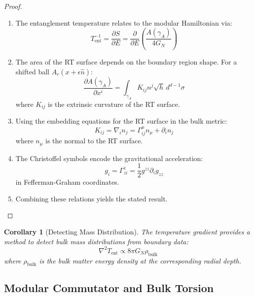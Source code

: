 \documentclass[12pt,a4paper]{article}
\newtheorem{corollary}[theorem]{Corollary}
\begin{document}
\begin{proof}
\begin{enumerate}
    \item The entanglement temperature relates to the modular Hamiltonian via:
    \begin{equation}
    T_{\text{ent}}^{-1} = \frac{\partial S}{\partial E} = \frac{\partial}{\partial E}\left( \frac{A(\gamma_A)}{4G_N} \right)
    \end{equation}
    
    \item The area of the RT surface depends on the boundary region shape. For a shifted ball $A_r(x + \epsilon \hat{n})$:
    \begin{equation}
    \frac{\partial A(\gamma_A)}{\partial x^i} = \int_{\gamma_A} K_{ij} n^j \sqrt{h} \, d^{d-1}\sigma
    \end{equation}
    where $K_{ij}$ is the extrinsic curvature of the RT surface.
    
    \item Using the embedding equations for the RT surface in the bulk metric:
    \begin{equation}
    K_{ij} = \nabla_i n_j = \Gamma^\mu_{ij} n_\mu + \partial_i n_j
    \end{equation}
    where $n_\mu$ is the normal to the RT surface.
    
    \item The Christoffel symbols encode the gravitational acceleration:
    \begin{equation}
    g_i = \Gamma^z_{zi} = \frac{1}{2}g^{zz}\partial_i g_{zz}
    \end{equation}
    in Fefferman-Graham coordinates.
    
    \item Combining these relations yields the stated result.
\end{enumerate}
\end{proof}

\begin{corollary}[Detecting Mass Distribution]
The temperature gradient provides a method to detect bulk mass distributions from boundary data:
\begin{equation}
\nabla^2 T_{\text{ent}} \propto 8\pi G_N \rho_{\text{bulk}}
\end{equation}
where $\rho_{\text{bulk}}$ is the bulk matter energy density at the corresponding radial depth.
\end{corollary}

\subsection{Modular Commutator and Bulk Torsion}
\end{document}
